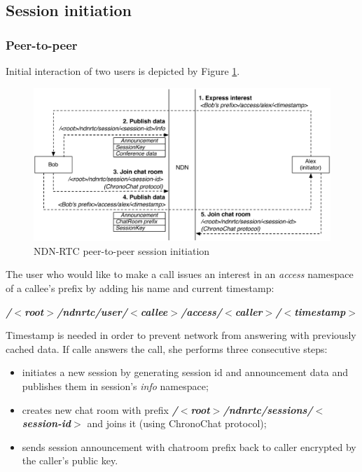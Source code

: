 \documentclass[12pt]{article}
\begin{document}
\subsection{Session initiation}
\subsubsection{Peer-to-peer}
Initial interaction of two users is depicted by Figure \ref{fig:p2p}.

\begin{figure}[Ht!]
\centering
\includegraphics[width=\textwidth]{../res/graphics/p2p}
\caption{NDN-RTC peer-to-peer session initiation}
\label{fig:p2p}
\end{figure}

The user who would like to make a call issues an interest in an \textit{access} namespace of a callee's prefix by adding his name and current timestamp:

\begin{center}  \textbf{\textit{/$<$root$>$/ndnrtc/user/$<$callee$>$/access/$<$caller$>$/$<$timestamp$>$}}
\end{center}

Timestamp is needed in order to prevent network from answering with previously cached data. If calle answers the call, she performs three consecutive steps:
\begin{itemize}
\item initiates a new session by generating session id and announcement data and publishes them in session's \textit{info} namespace;
\item creates new chat room with prefix \textbf{\textit{/$<$root$>$/ndnrtc/sessions/$<$session-id$>$}}
 and joins it (using ChronoChat protocol);
 \item sends session announcement with chatroom prefix back to caller encrypted by the caller's public key.
\end{itemize}
\end{document}
